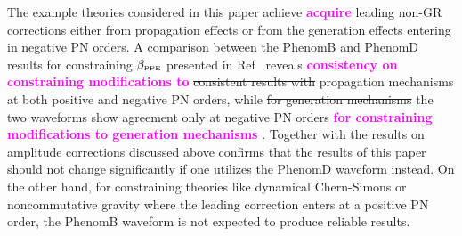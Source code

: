 \documentclass[prd,twocolumn,nofootinbib]{revtex4-1}
\newcommand{\PPE}{{\mbox{\tiny PPE}}}
\newcommand{\kent}[1]{\textcolor{magenta}{\textbf{#1}} }
\begin{document}
The example theories considered in this paper \sout{achieve} \kent{acquire} leading non-GR corrections either from propagation effects or from the generation effects entering in negative PN orders. A comparison between the PhenomB and PhenomD results for constraining $\beta_{\PPE}$ presented in Ref~\citep{Yunes:2016jcc} reveals \kent{consistency on constraining modifications to} \sout{consistent results with} propagation mechanisms at both positive and negative PN orders, while \sout{for generation mechanisms} the two waveforms show agreement only at negative PN orders \kent{for constraining modifications to generation mechanisms}. Together with the results on amplitude corrections discussed above confirms that the results of this paper should not change significantly if one utilizes the PhenomD waveform instead. On the other hand, for constraining theories like dynamical Chern-Simons or noncommutative gravity where the leading correction enters at a positive PN order, the PhenomB waveform is not expected to produce reliable results.




\end{document}
